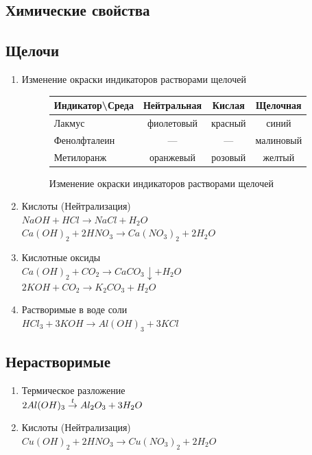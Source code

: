 \subsection{Химические свойства}
\subsection{Щелочи}
\begin{enumerate}
    \item Изменение окраски индикаторов растворами щелочей
        \begin{figure*}[h!]
            \centering
            \begin{tabular}[b]{| l | c | c | c |}
                \hline
                Индикатор\textbackslash Среда & Нейтральная & Кислая & Щелочная \\
                \hline
                Лакмус & фиолетовый & красный & синий \\
                \hline
                Фенолфталеин & --- & --- & малиновый \\
                \hline
                Метилоранж & оранжевый & розовый & желтый \\
                \hline
            \end{tabular}
            \caption{Изменение окраски индикаторов растворами щелочей}
        \end{figure*}

    \item Кислоты (Нейтрализация)\\
        $NaOH + HCl \rightarrow NaCl + H_2O$\\
        $Ca(OH)_2 + 2HNO_3 \rightarrow Ca(NO_3)_2 + 2H_2O$

    \item Кислотные оксиды\\
        $Ca(OH)_2 + CO_2 \rightarrow CaCO_3\downarrow + H_2O$\\
        $2KOH + CO_2 \rightarrow K_2CO_3 + H_2O$

    \item Растворимые в воде соли\\
        $HCl_3 + 3KOH \rightarrow Al(OH)_3 + 3KCl$

\end{enumerate}


\subsection{Нерастворимые}
\begin{enumerate}
    \item Термическое разложение \\
        $2Al(OH)_3 \stackrel{t}{\rightarrow} Al_2O_3 + 3H_2O$

    \item Кислоты (Нейтрализация)\\
        $Cu(OH)_2 + 2HNO_3 \rightarrow Cu(NO_3)_2 + 2H_2O$
\end{enumerate}
